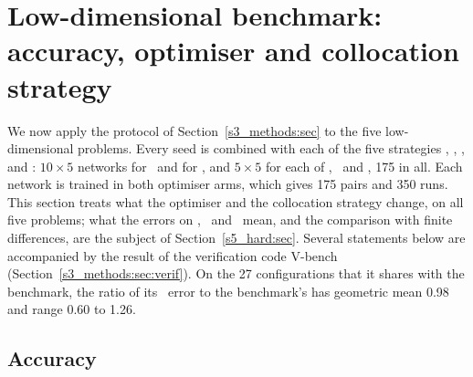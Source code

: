 \section{Low-dimensional benchmark: accuracy, optimiser and collocation strategy}
\label{s4_lowdim:sec}

We now apply the protocol of Section~\ref{s3_methods:sec} to the five low-dimensional
problems. Every seed is combined with each of the five strategies ,
, ,  and : $10\times5$ networks for
\PH\ and for \PLtwo, and $5\times5$ for each of \PWone, \PWtwo\ and \PLthree, 175 in all.
Each network is trained in both optimiser arms, which gives 175 pairs and 350 runs.
This section treats what the optimiser and the collocation strategy change, on all five
problems; what the errors on \PWone, \PWtwo\ and \PLthree\ mean, and the comparison with
finite differences, are the subject of Section~\ref{s5_hard:sec}. Several statements below
are accompanied by the result of the verification code \textsf{V-bench}
(Section~\ref{s3_methods:sec:verif}). On the 27 configurations that it shares with the
benchmark, the ratio of its \AdamLBFGS\ error to the benchmark's has geometric mean 0.98 and
range 0.60 to 1.26.

\subsection{Accuracy}\label{s4_lowdim:sec:accuracy}

